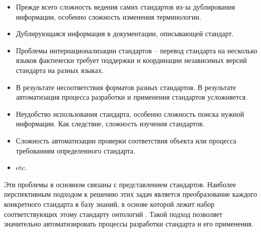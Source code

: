 \begin{itemize}
\item Прежде всего сложность ведения самих стандартов из-за дублирования информации, особенно сложность изменения терминологии.
\item Дублирующаяся информация в документации, описывающей стандарт.
\item Проблемы интернационализации стандартов -- перевод стандарта на несколько языков фактически требует поддержки и координации независимых версий стандарта на разных языках.
\item В результате несоответствия форматов разных стандартов. В результате автоматизация процесса разработки и применения стандартов усложняется.
\item Неудобство использования стандарта, особенно сложность поиска нужной информации. Как следствие, сложность изучения стандартов.
\item Сложность автоматизации проверки соответствия объекта или процесса требованиям определенного стандарта.
\item etc.
\end{itemize}

Эти проблемы в основном связаны с представлением стандартов. Наиболее перспективным подходом к решению этих задач является преобразование каждого конкретного стандарта в базу знаний, в основе которой лежит набор соответствующих этому стандарту онтологий \cite{Golenkov2019,Серенков-2004,Углев-2012,Совершенствование-2017,ISA-88-формализация}. Такой подход позволяет значительно автоматизировать процессы разработки стандарта и его применения.

